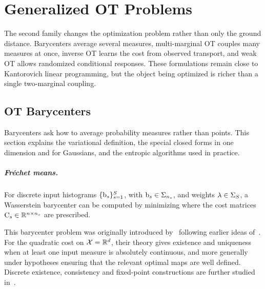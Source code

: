 
\chapter{Generalized OT Problems}
\label{sec-generalized-ot-problems}

The second family changes the optimization problem rather than only the ground distance. Barycenters average several measures, multi-marginal OT couples many measures at once, inverse OT learns the cost from observed transport, and weak OT allows randomized conditional responses. These formulations remain close to Kantorovich linear programming, but the object being optimized is richer than a single two-marginal coupling.

\section{OT Barycenters}
\label{sec-barycenters}

Barycenters ask how to average probability measures rather than points. This section explains the variational definition, the special closed forms in one dimension and for Gaussians, and the entropic algorithms used in practice.

\paragraph{Fr\'echet means.}

For discrete input histograms $\{\mathrm{b}_s\}_{s=1}^S$, with $\mathrm{b}_s \in \Sigma_{n_s}$, and weights $\lambda \in \Sigma_S$, a Wasserstein barycenter can be computed by minimizing
where the cost matrices $\mathrm{C}_s \in \mathbb{R}^{n \times n_s}$ are prescribed.

This barycenter problem was originally introduced by~\cite{Carlier_wasserstein_barycenter} following earlier ideas of~\cite{carlierekelandmatching}. For the quadratic cost on $\mathcal{X}=\mathbb{R}^d$, their theory gives existence and uniqueness when at least one input measure is absolutely continuous, and more generally under hypotheses ensuring that the relevant optimal maps are well defined. Discrete existence, consistency and fixed-point constructions are further studied in~\cite{anderes2016discrete,alvarez2016fixed,leGouic2016existence}.

